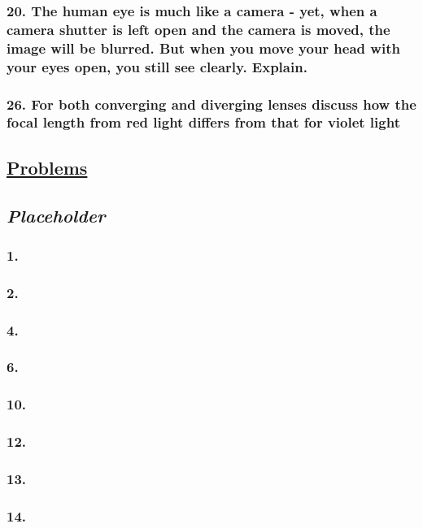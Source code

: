 \documentclass{article}
\begin{document}
\subsubsection*{
    20. The human eye is much like a camera - yet, when a camera shutter is left open
    and the camera is moved, the image will be blurred. But when you move your head
    with your eyes open, you still see clearly. Explain.
}
\subsubsection*{
    26. For both converging and diverging lenses discuss how the focal length
        from red light differs from that for violet light 
}
\newpage
\begin{center}
    \section*{\textbf{\underline {Problems}}}
    \subsection*{\textbf{\textit{Placeholder}}}
\end{center}
\subsubsection*{
    1. 
}
\subsubsection*{
    2. 
}
\subsubsection*{
    4. 
}
\subsubsection*{
    6. 
}
\subsubsection*{
    10. 
}
\subsubsection*{
    12. 
}
\subsubsection*{
    13. 
}
\subsubsection*{
    14. 
}
\end{document}
